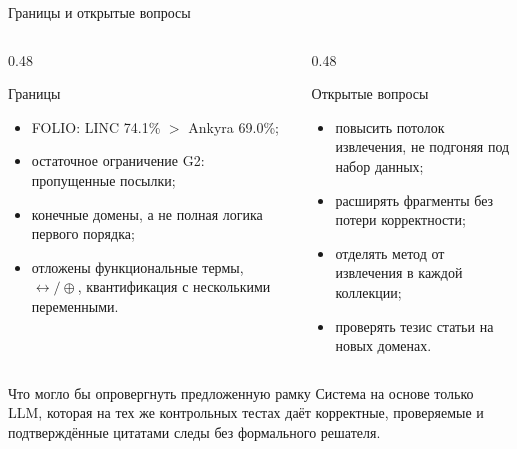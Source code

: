 \documentclass[aspectratio=169,11pt]{beamer}
\begin{document}
\begin{frame}[shrink=6]{Границы и открытые вопросы}
  \footnotesize
  \begin{columns}[T,onlytextwidth]
    \begin{column}{0.48\textwidth}
      \begin{block}{Границы}
        \begin{itemize}
          \item FOLIO: LINC 74.1\% \(>\) Ankyra 69.0\%;
          \item остаточное ограничение G2: пропущенные посылки;
          \item конечные домены, а не полная логика первого порядка;
          \item отложены функциональные термы, \(\leftrightarrow/\oplus\),
                квантификация с несколькими переменными.
        \end{itemize}
      \end{block}
    \end{column}
    \begin{column}{0.48\textwidth}
      \begin{block}{Открытые вопросы}
        \begin{itemize}
          \item повысить потолок извлечения, не подгоняя под набор данных;
          \item расширять фрагменты без потери корректности;
          \item отделять метод от извлечения в каждой коллекции;
          \item проверять тезис статьи на новых доменах.
        \end{itemize}
      \end{block}
    \end{column}
  \end{columns}

  \vspace{2mm}
  \begin{block}{Что могло бы опровергнуть предложенную рамку}
    Система на основе только LLM, которая на тех же контрольных тестах даёт
    корректные, проверяемые и подтверждённые цитатами следы без формального
    решателя.
  \end{block}
\end{frame}
\end{document}

